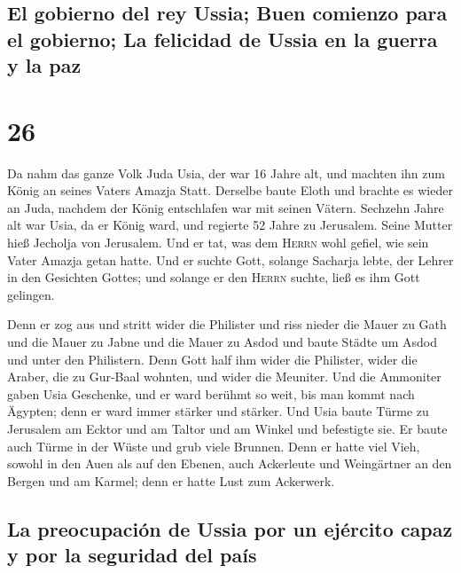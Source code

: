 \hypertarget{el-gobierno-del-rey-ussia-buen-comienzo-para-el-gobierno-la-felicidad-de-ussia-en-la-guerra-y-la-paz}{%
\subsection{El gobierno del rey Ussia; Buen comienzo para el gobierno;
La felicidad de Ussia en la guerra y la
paz}\label{el-gobierno-del-rey-ussia-buen-comienzo-para-el-gobierno-la-felicidad-de-ussia-en-la-guerra-y-la-paz}}

\hypertarget{section-25}{%
\section{26}\label{section-25}}

 Da nahm das ganze Volk Juda Usia, der war 16 Jahre alt,
und machten ihn zum König an seines Vaters Amazja Statt. 
Derselbe baute Eloth und brachte es wieder an Juda, nachdem der König
entschlafen war mit seinen Vätern.  Sechzehn Jahre alt war
Usia, da er König ward, und regierte 52 Jahre zu Jerusalem. Seine Mutter
hieß Jecholja von Jerusalem.  Und er tat, was dem
\textsc{Herrn} wohl gefiel, wie sein Vater Amazja getan hatte.
 Und er suchte Gott, solange Sacharja lebte, der Lehrer in
den Gesichten Gottes; und solange er den \textsc{Herrn} suchte, ließ es
ihm Gott gelingen.

 Denn er zog aus und stritt wider die Philister und riss
nieder die Mauer zu Gath und die Mauer zu Jabne und die Mauer zu Asdod
und baute Städte um Asdod und unter den Philistern.  Denn
Gott half ihm wider die Philister, wider die Araber, die zu Gur-Baal
wohnten, und wider die Meuniter.  Und die Ammoniter gaben
Usia Geschenke, und er ward berühmt so weit, bis man kommt nach Ägypten;
denn er ward immer stärker und stärker.  Und Usia baute
Türme zu Jerusalem am Ecktor und am Taltor und am Winkel und befestigte
sie.  Er baute auch Türme in der Wüste und grub viele
Brunnen. Denn er hatte viel Vieh, sowohl in den Auen als auf den Ebenen,
auch Ackerleute und Weingärtner an den Bergen und am Karmel; denn er
hatte Lust zum Ackerwerk.

\hypertarget{la-preocupaciuxf3n-de-ussia-por-un-ejuxe9rcito-capaz-y-por-la-seguridad-del-pauxeds}{%
\subsection{La preocupación de Ussia por un ejército capaz y por la
seguridad del
país}\label{la-preocupaciuxf3n-de-ussia-por-un-ejuxe9rcito-capaz-y-por-la-seguridad-del-pauxeds}}

